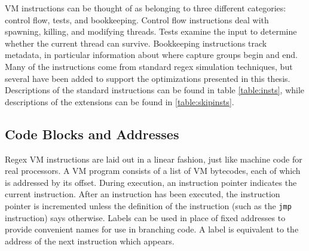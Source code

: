 VM instructions can be thought of as belonging to three different categories:
control flow, tests, and bookkeeping. Control flow instructions deal with
spawning, killing, and modifying threads. Tests examine the input to determine
whether the current thread can survive. Bookkeeping instructions track metadata,
in particular information about where capture groups begin and end.
Many of the instructions come from standard regex simulation
techniques, but several have been added to support the optimizations
presented in this thesis. Descriptions of the standard instructions 
can be found in table \ref{table:insts}, while descriptions of the
extensions can be found in \ref{table:skipinsts}.

\subsection{Code Blocks and Addresses}

Regex VM instructions are laid out in a linear fashion, just like
machine code for real processors. A VM program consists of a list of
VM bytecodes, each of which is addressed by its offset. During
execution, an instruction pointer indicates the current instruction.
After an instruction has been executed, the instruction pointer
is incremented unless the definition of the instruction (such as
the \verb'jmp' instruction) says otherwise. Labels can be used
in place of fixed addresses to provide convenient names for
use in branching code. A label is equivalent to the address
of the next instruction which appears.

